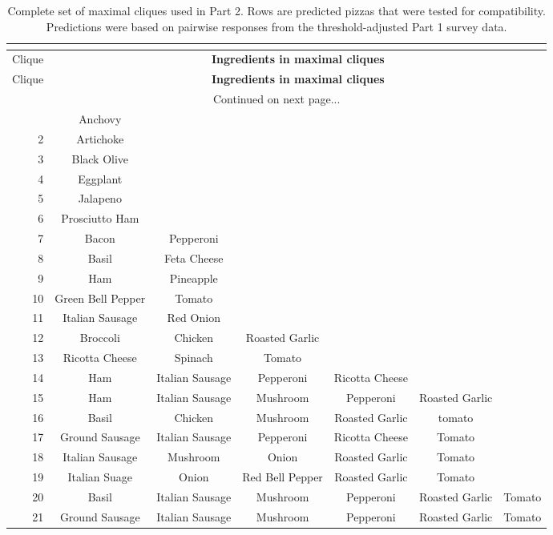 \begin{landscape}
\footnotesize
\begin{longtable}{rcccccc}
\caption[Complete set of maximal cliques used in Part 2.]{Complete set of maximal cliques used in Part 2. Rows are predicted pizzas that were tested for compatibility. Predictions were based on pairwise responses from the threshold-adjusted Part 1 survey data.} \\
\label{tab:pizzmax} \\
\toprule
Clique & \multicolumn{6}{c}{\bf Ingredients in maximal cliques} \\
\midrule
\endfirsthead
\toprule
Clique & \multicolumn{6}{c}{\bf Ingredients in maximal cliques} \\
\midrule
\endhead
\midrule
 \multicolumn{7}{c}{Continued on next page...} \\
\endfoot
\bottomrule
\endlastfoot
1 & Anchovy & & & & & \\
2 & Artichoke & & & & & \\
3 & Black Olive & &&&& \\
4 & Eggplant & & & & & \\
5 & Jalapeno & & & & & \\
6 & Prosciutto Ham & & & & &\\
7 & Bacon &  Pepperoni & & & &\\
8 & Basil & Feta Cheese &&&&\\
9 & Ham & Pineapple &&&&\\
10 & Green Bell Pepper & Tomato &&&&\\
11 & Italian Sausage & Red Onion &&&&\\
12 & Broccoli & Chicken & Roasted Garlic &&&\\
13 & Ricotta Cheese & Spinach & Tomato &&&\\
14 & Ham & Italian Sausage & Pepperoni & Ricotta Cheese &&\\
15 & Ham & Italian Sausage & Mushroom & Pepperoni & Roasted Garlic &\\
16 & Basil & Chicken & Mushroom & Roasted Garlic &tomato &\\
17 & Ground Sausage & Italian Sausage & Pepperoni & Ricotta Cheese & Tomato &\\
18 & Italian Sausage & Mushroom & Onion & Roasted Garlic & Tomato &\\
19 & Italian Suage & Onion & Red Bell Pepper & Roasted Garlic & Tomato &\\
20 & Basil & Italian Sausage &  Mushroom & Pepperoni & Roasted Garlic & Tomato \\
21 & Ground Sausage & Italian Sausage & Mushroom & Pepperoni & Roasted Garlic & Tomato \\
\end{longtable}
\end{landscape}


